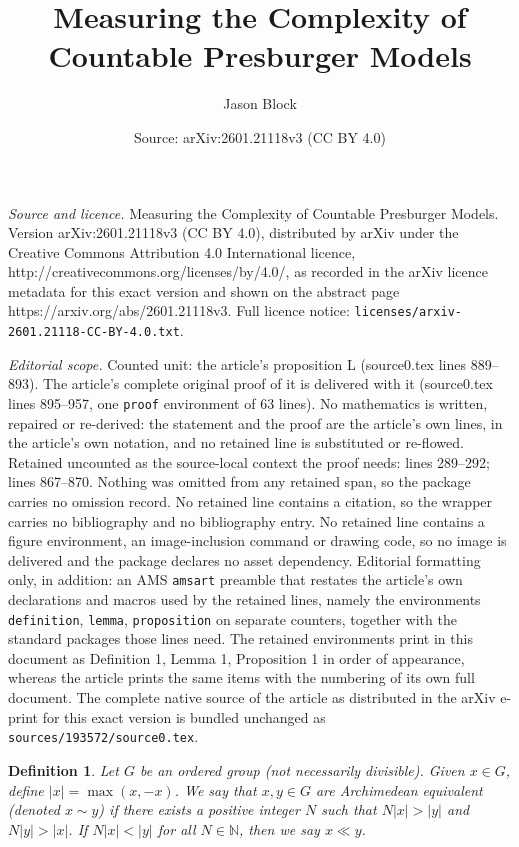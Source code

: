 \documentclass[10pt,a4paper]{amsart}
\title{Measuring the Complexity of Countable Presburger Models}
\author{Jason Block}
\date{Source: arXiv:2601.21118v3 (CC BY 4.0)}
\newtheorem{definition}{Definition}
\newcommand{\N}{\mathbb{N}}
\begin{document}
\maketitle

\noindent\emph{Source and licence.} Measuring the Complexity of Countable Presburger Models. Version arXiv:2601.21118v3 (CC BY 4.0), distributed by arXiv under the Creative Commons Attribution 4.0 International licence, http://creativecommons.org/licenses/by/4.0/, as recorded in the arXiv licence metadata for this exact version and shown on the abstract page https://arxiv.org/abs/2601.21118v3. Full licence notice: \texttt{licenses/arxiv-2601.21118-CC-BY-4.0.txt}.\par\smallskip

\noindent\textit{Editorial scope.} Counted unit: the article's proposition L (source0.tex lines 889--893). The article's complete original proof of it is delivered with it (source0.tex lines 895--957, one \texttt{proof} environment of 63 lines). No mathematics is written, repaired or re-derived: the statement and the proof are the article's own lines, in the article's own notation, and no retained line is substituted or re-flowed.  Retained uncounted as the source-local context the proof needs: lines 289--292; lines 867--870.  Nothing was omitted from any retained span, so the package carries no omission record.  No retained line contains a citation, so the wrapper carries no bibliography and no bibliography entry.  No retained line contains a figure environment, an image-inclusion command or drawing code, so no image is delivered and the package declares no asset dependency.  Editorial formatting only, in addition: an AMS \texttt{amsart} preamble that restates the article's own declarations and macros used by the retained lines, namely the environments \texttt{definition}, \texttt{lemma}, \texttt{proposition} on separate counters, together with the standard packages those lines need.  The retained environments print in this document as Definition 1, Lemma 1, Proposition 1 in order of appearance, whereas the article prints the same items with the numbering of its own full document.  The complete native source of the article as distributed in the arXiv e-print for this exact version is bundled unchanged as \texttt{sources/193572/source0.tex}.
\begin{definition}
\label{arch equiv}
Let $G$ be an ordered group (not necessarily divisible). Given $x\in G$, define $|x|=\max(x,-x)$. We say that $x,y\in G$ are Archimedean equivalent (denoted $x\sim y$) if there exists a positive integer $N$ such that $N|x|>|y|$ and $N|y|>|x|$. If $N|x|<|y|$ for all $N\in \N$, then we say $x\ll y$. 
\end{definition}
\end{document}
